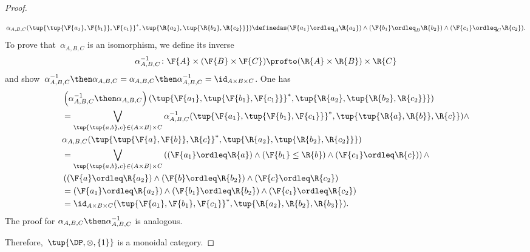 \begin{proof}
\begin{compactitem}
\begin{equation}
      \alpha_{A,B,C}(\tup{\tup{\F{a_1},\F{b_1}},\F{c_1}}^*,\tup{\R{a_2},\tup{\R{b_2},\R{c_2}}})\definedas (\F{a_1}\ordleq_A \R{a_2}) \wedge (\F{b_1} \ordleq_B \R{b_2})\wedge (\F{c_1}\ordleq_C \R{c_2}).
    \end{equation}
    To prove that~$\alpha_{A,B,C}$ is an isomorphism, we define its inverse \begin{equation}
                                                                              \alpha_{A,B,C}^{-1}\colon \F{A}\times (\F{B}\times \F{C}) \profto (\R{A}\times \R{B})\times \R{C}
    \end{equation}
    and show~$\alpha_{A,B,C}^{-1}\then \alpha_{A,B,C}=\alpha_{A,B,C}\then \alpha_{A,B,C}^{-1}= \id_{A\times B\times C}$. One has
    \begin{equation}
      \begin{aligned}
        &\left( \alpha_{A,B,C}^{-1}\then \alpha_{A,B,C} \right)(\tup{\F{a_1},\tup{\F{b_1},\F{c_1}}}^*,\tup{\R{a_2},\tup{\R{b_2},\R{c_2}}})\\
        &=\bigvee_{\tup{\tup{a,b},c}\in (A\times B)\times C}
        \alpha_{A,B,C}^{-1}(\tup{\F{a_1},\tup{\F{b_1},\F{c_1}}}^*,\tup{\tup{\R{a},\R{b}},\R{c}})\wedge\\
        &\alpha_{A,B,C}(\tup{\tup{\F{a},\F{b}},\R{c}}^*,\tup{\R{a_2},\tup{\R{b_2},\R{c_2}}})\\
        &=\bigvee_{\tup{\tup{a,b},c}\in (A\times B)\times C}\left( (\F{a_1}\ordleq \R{a}) \wedge (\F{b_1}\leq \R{b}) \wedge (\F{c_1}\ordleq \R{c})\right)\wedge \\
        & \left((\F{a}\ordleq \R{a_2})\wedge (\F{b}\ordleq \R{b_2}) \wedge (\F{c}\ordleq \R{c_2}\right)\\
        &=(\F{a_1}\ordleq \R{a_2}) \wedge (\F{b_1}\ordleq \R{b_2}) \wedge (\F{c_1}\ordleq \R{c_2})\\
        &=\id_{A\times B\times C}(\tup{\F{a_1},\F{b_1},\F{c_1}}^*,\tup{\R{a_2},\R{b_2},\R{b_3}}).
      \end{aligned}
    \end{equation}
    The proof for $\alpha_{A,B,C}\then \alpha_{A,B,C}^{-1}$ is analogous.
  \end{compactitem}
  Therefore,~$\tup{\DP,\otimes, \{1\}}$ is a monoidal category.
\end{proof}

